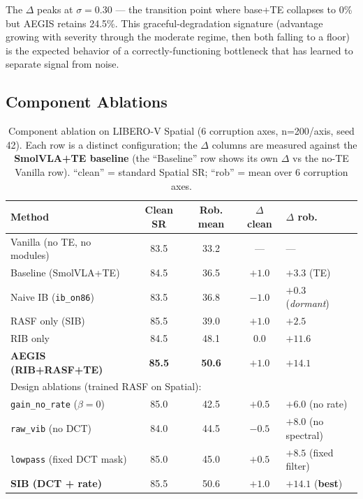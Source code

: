 \documentclass[11pt,a4paper]{article}
\newcommand{\win}[1]{{\color{frozengreen}\textbf{#1}}}
\begin{document}
The $\Delta$ peaks at $\sigma=0.30$ — the transition point where base+TE collapses to 0\%
but AEGIS retains 24.5\%. This graceful-degradation signature (advantage growing with severity
through the moderate regime, then both falling to a floor) is the expected behavior of a
correctly-functioning bottleneck that has learned to separate signal from noise.

\subsection{Component Ablations}
\label{sec:ablation}

\begin{table}[H]
\centering
\caption{Component ablation on LIBERO-V Spatial (6 corruption axes, n=200/axis, seed 42).
Each row is a distinct configuration; the $\Delta$ columns are measured against the
\textbf{SmolVLA+TE baseline} (the ``Baseline'' row shows its own $\Delta$ vs the no-TE Vanilla row).
``clean'' = standard Spatial SR; ``rob'' = mean over 6 corruption axes.}
\label{tab:ablation}
\small
\begin{tabular}{lcccl}
\toprule
Method & Clean SR & Rob. mean & $\Delta$ clean & $\Delta$ rob. \\
\midrule
Vanilla (no TE, no modules) & 83.5 & 33.2 & — & — \\
Baseline (SmolVLA+TE) & 84.5 & 36.5 & $+1.0$ & $+3.3$ (TE) \\
Naive IB (\texttt{ib\_on86}) & 83.5 & 36.8 & $-1.0$ & $+0.3$ (\textit{dormant}) \\
RASF only (SIB) & 85.5 & 39.0 & $+1.0$ & $+2.5$ \\
RIB only & 84.5 & 48.1 & $0.0$ & $+11.6$ \\
\textbf{AEGIS (RIB+RASF+TE)} & \win{\textbf{85.5}} & \win{\textbf{50.6}} & $+1.0$ & $+14.1$ \\
\midrule
\multicolumn{5}{l}{\small Design ablations (trained RASF on Spatial):} \\
\texttt{gain\_no\_rate} ($\beta=0$) & 85.0 & 42.5 & $+0.5$ & $+6.0$ (no rate) \\
\texttt{raw\_vib} (no DCT) & 84.0 & 44.5 & $-0.5$ & $+8.0$ (no spectral) \\
\texttt{lowpass} (fixed DCT mask) & 85.0 & 45.0 & $+0.5$ & $+8.5$ (fixed filter) \\
\textbf{SIB (DCT + rate)} & 85.5 & 50.6 & $+1.0$ & $+14.1$ (\textbf{best}) \\
\bottomrule
\end{tabular}
\end{table}
\end{document}
